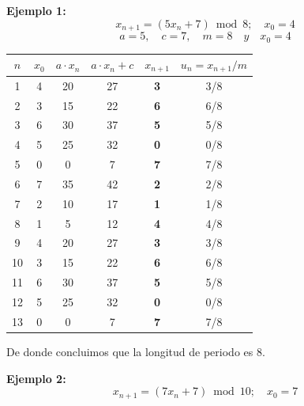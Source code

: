 \documentclass[11pt,letterpaper]{report}
\begin{document}
\textbf{Ejemplo 1:}
\[
x_{n+1} = (5x_n + 7) \bmod 8;\quad x_0 = 4
\]
\[
a = 5,\quad c = 7,\quad m = 8 \quad y \quad x_0 = 4
\]

\begin{table}[H]
\centering
\begin{tabular}{|c|c|c|c|c|c|}
\hline
$n$ & $x_0$ & $a \cdot x_n$ & $a \cdot x_n + c$ & $x_{n+1}$ & $u_n = x_{n+1}/m$\\
\hline
1 & 4 & 20 & 27 & \textbf{3} & 3/8\\
2 & 3 & 15 & 22 & \textbf{6} & 6/8\\
3 & 6 & 30 & 37 & \textbf{5} & 5/8\\
4 & 5 & 25 & 32 & \textbf{0} & 0/8\\
5 & 0 & 0 & 7 & \textbf{7} & 7/8\\
6 & 7 & 35 & 42 & \textbf{2} & 2/8\\
7 & 2 & 10 & 17 & \textbf{1} & 1/8\\
8 & 1 & 5 & 12 & \textbf{4} & 4/8\\
\hline
9 & 4 & 20 & 27 & \textbf{3} & 3/8\\
10 & 3 & 15 & 22 & \textbf{6} & 6/8\\
11 & 6 & 30 & 37 & \textbf{5} & 5/8\\
12 & 5 & 25 & 32 & \textbf{0} & 0/8\\
13 & 0 & 0 & 7 & \textbf{7} & 7/8\\
\hline
\end{tabular}
\end{table}

\begin{center}
\end{center}

De donde concluimos que la longitud de periodo es 8.

\textbf{Ejemplo 2:}
\[
x_{n+1} = (7x_n + 7) \bmod 10;\quad x_0 = 7
\]
\end{document}
